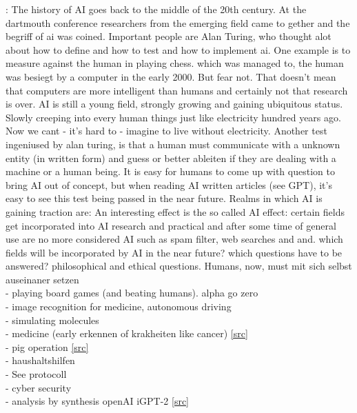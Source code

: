 : The history of AI goes back to the middle of the 20th century. At the dartmouth conference researchers from the emerging field came to gether and the begriff of ai was coined. Important people are Alan Turing, who thought alot about how to define and how to test and how to implement ai. One example is to measure against the human in playing chess. which was managed to, the human was besiegt by a computer in the early 2000. But fear not. That doesn't mean that computers are more intelligent than humans and certainly not that research is over. AI is still a young field, strongly growing and gaining ubiquitous status. Slowly creeping into every human things just like electricity hundred years ago. Now we cant - it's hard to - imagine to live without electricity. Another test ingeniused by alan turing, is that a human must communicate with a unknown entity (in written form) and guess or better ableiten if they are dealing with a machine or a human being. It is easy for humans to come up with question to bring AI out of concept, but when reading AI written articles (see GPT), it's easy to see this test being passed in the near future. 
Realms in which AI is gaining traction are: 
An interesting effect is the so called AI effect: certain fields get incorporated into AI research and practical and after some time of general use are no more considered AI such as spam filter, web searches and and. 
which fields will be incorporated by AI in the near future? 
which questions have to be answered? philosophical and ethical questions. 
Humans, now, must mit sich selbst auseinaner setzen 
%
\clearpage
%
\\
 - playing board games (and beating humans). alpha go zero \cite{Silver2017}\\
 - image recognition for medicine\cite{Li2020,Deo2015,Topol2019}, autonomous driving \cite{Fujiyoshi2019}\\
 - simulating molecules \cite{Westermayr2019}\\
 - medicine (early erkennen of krakheiten like cancer) \href{https://med.stanford.edu/radiology/news/2020/smart-toilet.html}{[src]}\\
 - pig operation \href{https://www.science.org/doi/10.1126/scirobotics.abj2908}{[src]}\\
 - haushaltshilfen \\
 - See protocoll\\
 - cyber security\cite{Sarker2021}\\
 - analysis by synthesis openAI iGPT-2 \href{https://openai.com/blog/image-gpt/}{[src]}\\
